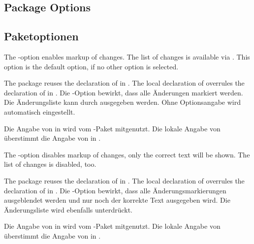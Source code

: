 \ifENGLISH
	\subsection{Package Options}
\fi
	\ifGERMAN
		\subsection{Paketoptionen}
	\fi
\label{sec:user:options}

\ifENGLISH
	The -option enables markup of changes.
	The list of changes is available via .
	This option is the default option, if no other option is selected.

	The  package reuses the declaration of  in .
	The local declaration of  overrules the declaration of  in .
\fi
	\ifGERMAN
		Die -Option bewirkt, dass alle Änderungen markiert werden.
		Die Änderungsliste kann durch  ausgegeben werden.
		Ohne Optionsangabe wird  automatisch eingestellt.

		Die Angabe von  in  wird vom -Paket mitgenutzt.
		Die lokale Angabe von  überstimmt die Angabe von  in .
	\fi


\ifENGLISH
	The -option disables markup of changes, only the correct text will be shown.
	The list of changes is disabled, too.

	The  package reuses the declaration of  in .
	The local declaration of  overrules the declaration of  in .
\fi
	\ifGERMAN
		Die -Option bewirkt, dass alle Änderungsmarkierungen ausgeblendet werden und nur noch der korrekte Text ausgegeben wird.
		Die Änderungsliste wird ebenfalls unterdrückt.

		Die Angabe von  in  wird vom -Paket mitgenutzt.
		Die lokale Angabe von  überstimmt die Angabe von  in .
	\fi


